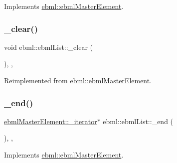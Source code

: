 Implements \mbox{\hyperlink{classebml_1_1ebmlMasterElement_ae6cdbf68d8267a7ab098bd402fa70e88}{ebml\+::ebml\+Master\+Element}}.

\mbox{\label{classebml_1_1ebmlList_a2e57019d123e9647b47148c6f827cbed}} 
\subsubsection{\texorpdfstring{\+\_\+clear()}{\_clear()}}
{\footnotesize\ttfamily void ebml\+::ebml\+List\+::\+\_\+clear (\begin{DoxyParamCaption}{ }\end{DoxyParamCaption})\hspace{0.3cm}{\ttfamily [override]}, {\ttfamily [protected]}, {\ttfamily [virtual]}}



Reimplemented from \mbox{\hyperlink{classebml_1_1ebmlMasterElement_a2fdf9fa1022f06a046fe94e631e266a3}{ebml\+::ebml\+Master\+Element}}.

\mbox{\label{classebml_1_1ebmlList_aec7a5554e1d10fd7575104471cb2c6f4}} 
\subsubsection{\texorpdfstring{\+\_\+end()}{\_end()}}
{\footnotesize\ttfamily \mbox{\hyperlink{classebml_1_1ebmlMasterElement_1_1__iterator}{ebml\+Master\+Element\+::\+\_\+iterator}}$\ast$ ebml\+::ebml\+List\+::\+\_\+end (\begin{DoxyParamCaption}{ }\end{DoxyParamCaption})\hspace{0.3cm}{\ttfamily [override]}, {\ttfamily [protected]}, {\ttfamily [virtual]}}



Implements \mbox{\hyperlink{classebml_1_1ebmlMasterElement_a352e5e11836063394990cb05c09d8e48}{ebml\+::ebml\+Master\+Element}}.

\mbox{\label{classebml_1_1ebmlList_a366d78242b59ec90774774cd278e5863}} 
